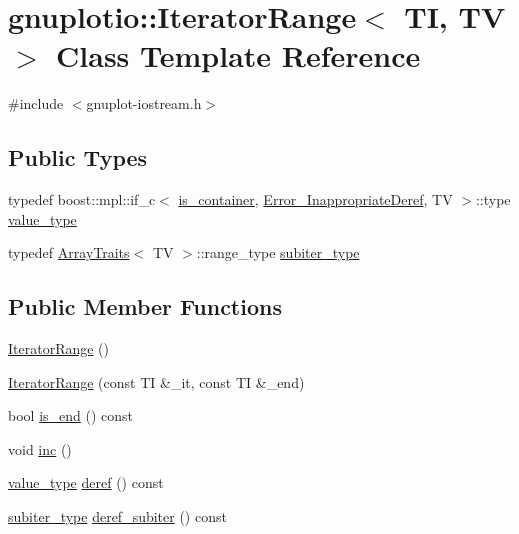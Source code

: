 \hypertarget{classgnuplotio_1_1_iterator_range}{}\section{gnuplotio\+:\+:Iterator\+Range$<$ TI, TV $>$ Class Template Reference}
\label{classgnuplotio_1_1_iterator_range}


{\ttfamily \#include $<$gnuplot-\/iostream.\+h$>$}

\subsection*{Public Types}
\begin{DoxyCompactItemize}
\item 
typedef boost\+::mpl\+::if\+\_\+c$<$ \hyperlink{classgnuplotio_1_1_iterator_range_a3f79d84bdf18761b6e49ae54d050f8ff}{is\+\_\+container}, \hyperlink{structgnuplotio_1_1_error___inappropriate_deref}{Error\+\_\+\+Inappropriate\+Deref}, TV $>$\+::type \hyperlink{classgnuplotio_1_1_iterator_range_a3d997739282df372a894c586c64a0687}{value\+\_\+type}
\item 
typedef \hyperlink{classgnuplotio_1_1_array_traits}{Array\+Traits}$<$ TV $>$\+::range\+\_\+type \hyperlink{classgnuplotio_1_1_iterator_range_a566ca30462a029f6df4ef16116f99acd}{subiter\+\_\+type}
\end{DoxyCompactItemize}
\subsection*{Public Member Functions}
\begin{DoxyCompactItemize}
\item 
\hyperlink{classgnuplotio_1_1_iterator_range_aa5789bb82a999548d3e5fc359a4c0c43}{Iterator\+Range} ()
\item 
\hyperlink{classgnuplotio_1_1_iterator_range_adb89135fc292dfc5152120bc7fe6135e}{Iterator\+Range} (const TI \&\+\_\+it, const TI \&\+\_\+end)
\item 
bool \hyperlink{classgnuplotio_1_1_iterator_range_a9146c3be94e09b6318cb0590b5816d1e}{is\+\_\+end} () const 
\item 
void \hyperlink{classgnuplotio_1_1_iterator_range_a369f392a561011f8f1c93d13fd976878}{inc} ()
\item 
\hyperlink{classgnuplotio_1_1_iterator_range_a3d997739282df372a894c586c64a0687}{value\+\_\+type} \hyperlink{classgnuplotio_1_1_iterator_range_a58c90f44319ecc5efe43b80892d3b7f2}{deref} () const 
\item 
\hyperlink{classgnuplotio_1_1_iterator_range_a566ca30462a029f6df4ef16116f99acd}{subiter\+\_\+type} \hyperlink{classgnuplotio_1_1_iterator_range_a03ee1f4e4e321d6c9676b632dcfc5969}{deref\+\_\+subiter} () const 
\end{DoxyCompactItemize}

